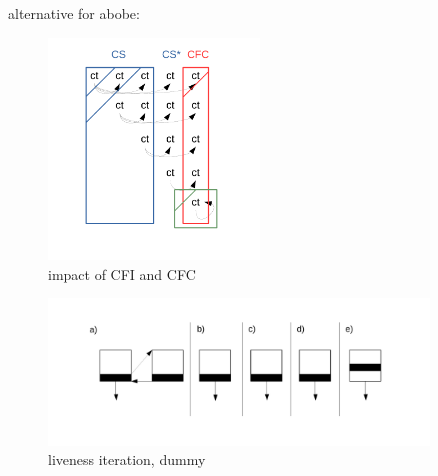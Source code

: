 % 

alternative for abobe:
\begin{figure}[!ht]
  \caption{impact of CFI and CFC}
  \centering
    \includegraphics[width=0.5\textwidth]{figures/impact_of_cfi_and_cfc.pdf}
\end{figure}

\begin{figure}[!ht]
  \caption{liveness iteration, dummy}
  \centering
    \includegraphics[width=0.9\textwidth]{figures/liveness_iteration.pdf}
\end{figure}

